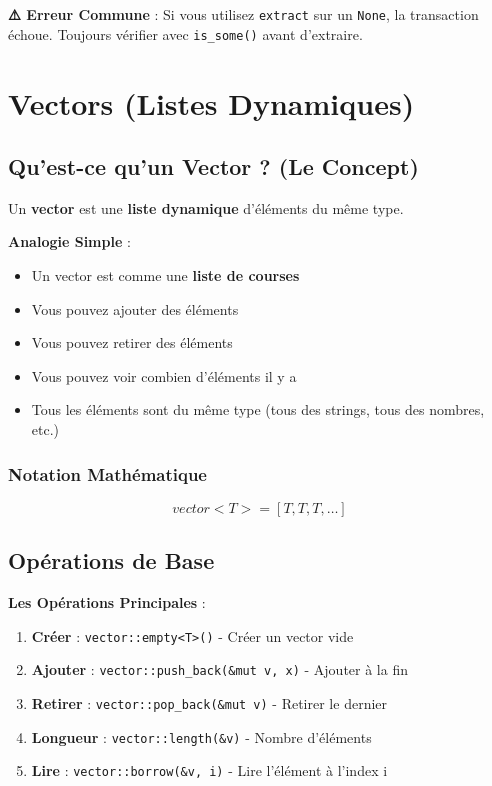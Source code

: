 \documentclass[11pt]{article}
\begin{document}
\begin{warnBox}
\textbf{⚠️ Erreur Commune} : Si vous utilisez \texttt{extract} sur un \texttt{None}, la transaction échoue. Toujours vérifier avec \texttt{is\_some()} avant d'extraire.
\end{warnBox}

\section{Vectors (Listes Dynamiques)}

\subsection{Qu'est-ce qu'un Vector ? (Le Concept)}

Un \textbf{vector} est une \textbf{liste dynamique} d'éléments du même type.

\begin{explainBox}
\textbf{Analogie Simple} :
\begin{itemize}
  \item Un vector est comme une \textbf{liste de courses}
  \item Vous pouvez ajouter des éléments
  \item Vous pouvez retirer des éléments
  \item Vous pouvez voir combien d'éléments il y a
  \item Tous les éléments sont du même type (tous des strings, tous des nombres, etc.)
\end{itemize}
\end{explainBox}

\subsubsection{Notation Mathématique}

\[
vector<T> = [T, T, T, \dots]
\]

\subsection{Opérations de Base}

\begin{explainBox}
\textbf{Les Opérations Principales} :
\begin{enumerate}
  \item \textbf{Créer} : \texttt{vector::empty<T>()} - Créer un vector vide
  \item \textbf{Ajouter} : \texttt{vector::push\_back(\&mut v, x)} - Ajouter à la fin
  \item \textbf{Retirer} : \texttt{vector::pop\_back(\&mut v)} - Retirer le dernier
  \item \textbf{Longueur} : \texttt{vector::length(\&v)} - Nombre d'éléments
  \item \textbf{Lire} : \texttt{vector::borrow(\&v, i)} - Lire l'élément à l'index i
\end{enumerate}
\end{explainBox}
\end{document}
